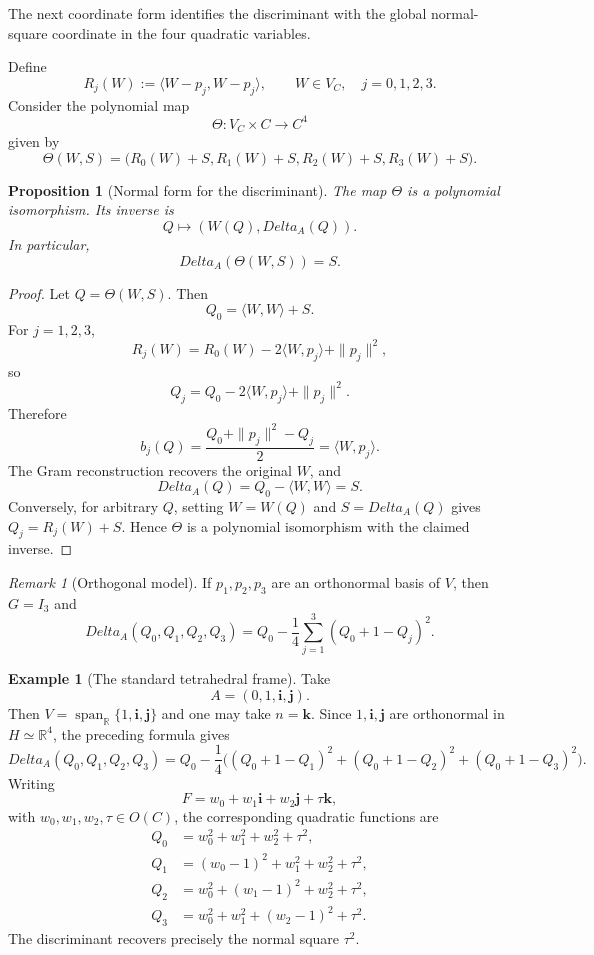 \documentclass[11pt]{amsart}
\def\HH{H}%
\def\CC{C}%
\def\OO{O}%
\def\DeltaA{Delta_A}%
\numberwithin{equation}{section}
\newtheorem{proposition}[theorem]{Proposition}
\theoremstyle{definition}
\newtheorem{example}[theorem]{Example}
\theoremstyle{remark}
\newtheorem{remark}[theorem]{Remark}
\newcommand{\HH}{\mathbb H}
\newcommand{\CC}{\mathbb C}
\newcommand{\RR}{\mathbb R}
\newcommand{\OO}{\mathcal O}
\newcommand{\DeltaA}{\Delta_A}
\begin{document}
The next coordinate form identifies the discriminant with the global normal-square coordinate in the four quadratic variables.

Define
\[
R_j(W):=\langle W-p_j,W-p_j\rangle,\qquad W\in V_{\CC},\quad j=0,1,2,3.
\]
Consider the polynomial map
\[
\Theta:V_{\CC}\times\CC\to\CC^4
\]
given by
\[
\Theta(W,S)=\bigl(R_0(W)+S,R_1(W)+S,R_2(W)+S,R_3(W)+S\bigr).
\]

\begin{proposition}[Normal form for the discriminant]\label{prop:normal-form}
The map $\Theta$ is a polynomial isomorphism. Its inverse is
\[
Q\longmapsto (W(Q),\DeltaA(Q)).
\]
In particular,
\[
\DeltaA(\Theta(W,S))=S.
\]
\end{proposition}

\begin{proof}
Let $Q=\Theta(W,S)$. Then
\[
Q_0=\langle W,W\rangle+S.
\]
For $j=1,2,3$,
\[
R_j(W)=R_0(W)-2\langle W,p_j\rangle+\|p_j\|^2,
\]
so
\[
Q_j=Q_0-2\langle W,p_j\rangle+\|p_j\|^2.
\]
Therefore
\[
b_j(Q)=\frac{Q_0+\|p_j\|^2-Q_j}{2}=\langle W,p_j\rangle.
\]
The Gram reconstruction recovers the original $W$, and
\[
\DeltaA(Q)=Q_0-\langle W,W\rangle=S.
\]
Conversely, for arbitrary $Q$, setting $W=W(Q)$ and $S=\DeltaA(Q)$ gives $Q_j=R_j(W)+S$. Hence $\Theta$ is a polynomial isomorphism with the claimed inverse.
\end{proof}

\begin{remark}[Orthogonal model]
If $p_1,p_2,p_3$ are an orthonormal basis of $V$, then $G=I_3$ and
\[
\DeltaA(Q_0,Q_1,Q_2,Q_3)=Q_0-\frac14\sum_{j=1}^3(Q_0+1-Q_j)^2.
\]
\end{remark}

\begin{example}[The standard tetrahedral frame]
Take
\[
A=(0,1,\mathbf i,\mathbf j).
\]
Then $V=\operatorname{span}_{\RR}\{1,\mathbf i,\mathbf j\}$ and one may take $n=\mathbf k$.  Since $1,\mathbf i,\mathbf j$ are orthonormal in $\HH\simeq\RR^4$, the preceding formula gives
\[
\DeltaA(Q_0,Q_1,Q_2,Q_3)
=Q_0-\frac14\bigl((Q_0+1-Q_1)^2+(Q_0+1-Q_2)^2+(Q_0+1-Q_3)^2\bigr).
\]
Writing
\[
F=w_0+w_1\mathbf i+w_2\mathbf j+\tau\mathbf k,
\]
with $w_0,w_1,w_2,\tau\in\OO(\CC)$, the corresponding quadratic functions are
\[
\begin{aligned}
Q_0&=w_0^2+w_1^2+w_2^2+\tau^2,\\
Q_1&=(w_0-1)^2+w_1^2+w_2^2+\tau^2,\\
Q_2&=w_0^2+(w_1-1)^2+w_2^2+\tau^2,\\
Q_3&=w_0^2+w_1^2+(w_2-1)^2+\tau^2.
\end{aligned}
\]
The discriminant recovers precisely the normal square $\tau^2$.
\end{example}
\end{document}
